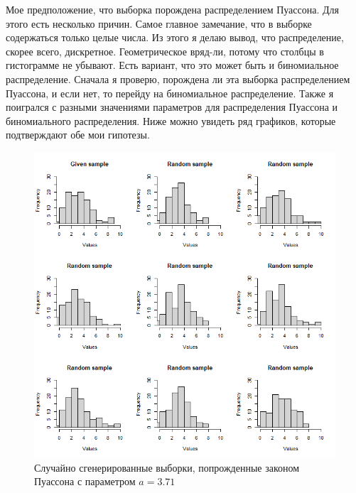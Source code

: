 \documentclass[14pt,a4paper]{scrartcl}
\theoremstyle{definition}
\theoremstyle{remark}
\theoremstyle{definition}
\theoremstyle{definition}
\begin{document}
Мое предположение, что выборка порождена распределением Пуассона. Для этого есть несколько причин. Самое главное замечание, что в выборке содержаться только целые числа. Из этого я делаю вывод, что распределение, скорее всего, дискретное. Геометрическое вряд-ли, потому что столбцы в гистограмме не убывают. Есть вариант, что это может быть и биномиальное распределение. Сначала я проверю, порождена ли эта выборка распределением Пуассона, и если нет, то перейду на биномиальное распределение. Также я поигрался с разными значениями параметров для распределения Пуассона и биномиального распределения. Ниже можно увидеть ряд графиков, которые подтверждают обе мои гипотезы.

\begin{figure}[H]
  \includegraphics[width=\linewidth]{RPlotPoiss.png}
  \caption{Случайно сгенерированные выборки, попрожденные законом Пуассона с параметром $a = 3.71$}
  \label{fig:image2}
\end{figure}
\end{document}
